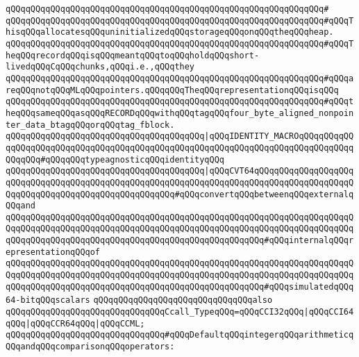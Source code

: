 \verb|qQQqqQQqqQQqqQQqqQQqqQQqqQQqqQQqqQQqqQQqqQQqqQQqqQQqqQQqqQQqqQQq#|\newline
\verb|qQQqqQQqqQQqqQQqqQQqqQQqqQQqqQQqqQQqqQQqqQQqqQQqqQQqqQQqqQQqqQQq#qQQqThisqQQqallocatesqQQquninitializedqQQqstorageqQQqonqQQqtheqQQqheap.|\newline
\verb|qQQqqQQqqQQqqQQqqQQqqQQqqQQqqQQqqQQqqQQqqQQqqQQqqQQqqQQqqQQqqQQq#qQQqTheqQQqrecordqQQqisqQQqmeantqQQqtoqQQqholdqQQqshort-livedqQQqCqQQqchunks,qQQqi.e.,qQQqthey|\newline
\verb|qQQqqQQqqQQqqQQqqQQqqQQqqQQqqQQqqQQqqQQqqQQqqQQqqQQqqQQqqQQqqQQq#qQQqareqQQqnotqQQqMLqQQqpointers.qQQqqQQqTheqQQqrepresentationqQQqisqQQq|\newline
\verb|qQQqqQQqqQQqqQQqqQQqqQQqqQQqqQQqqQQqqQQqqQQqqQQqqQQqqQQqqQQqqQQq#qQQqtheqQQqsameqQQqasqQQqRECORDqQQqwithqQQqtagqQQqfour_byte_aligned_nonpointer_data_btagqQQqorqQQqtag_fblock.|\newline
\newline
\verb|qQQqqQQqqQQqqQQqqQQqqQQqqQQqqQQqqQQqqQQq|\verb#|qQQqIDENTITY_MACROqQQqqQQqqQQqqQQqqQQqqQQqqQQqqQQqqQQqqQQqqQQqqQQqqQQqqQQqqQQqqQQqqQQqqQQqqQQqqQQqqQQqqQQq#\verb|#qQQqqQQqtypeagnosticqQQqidentityqQQq|\newline
\newline
\verb|qQQqqQQqqQQqqQQqqQQqqQQqqQQqqQQqqQQqqQQq|\verb#|qQQqCVT64qQQqqQQqqQQqqQQqqQQqqQQqqQQqqQQqqQQqqQQqqQQqqQQqqQQqqQQqqQQqqQQqqQQqqQQqqQQqqQQqqQQqqQQqqQQqqQQqqQQqqQQqqQQqqQQqqQQqqQQqqQQq#\verb|#qQQqconvertqQQqbetweenqQQqexternalqQQqand|\newline
\verb|qQQqqQQqqQQqqQQqqQQqqQQqqQQqqQQqqQQqqQQqqQQqqQQqqQQqqQQqqQQqqQQqqQQqqQQqqQQqqQQqqQQqqQQqqQQqqQQqqQQqqQQqqQQqqQQqqQQqqQQqqQQqqQQqqQQqqQQqqQQqqQQqqQQqqQQqqQQqqQQqqQQqqQQqqQQqqQQqqQQqqQQqqQQqqQQq#qQQqinternalqQQqrepresentationqQQqof|\newline
\verb|qQQqqQQqqQQqqQQqqQQqqQQqqQQqqQQqqQQqqQQqqQQqqQQqqQQqqQQqqQQqqQQqqQQqqQQqqQQqqQQqqQQqqQQqqQQqqQQqqQQqqQQqqQQqqQQqqQQqqQQqqQQqqQQqqQQqqQQqqQQqqQQqqQQqqQQqqQQqqQQqqQQqqQQqqQQqqQQqqQQqqQQqqQQqqQQq#qQQqsimulatedqQQq64-bitqQQqscalars|\newline
\newline
\verb|qQQqqQQqqQQqqQQqqQQqqQQqqQQqqQQqalso|\newline
\verb|qQQqqQQqqQQqqQQqqQQqqQQqqQQqqQQqCcall_TypeqQQq=qQQqCCI32qQQq|\verb#|qQQqCCI64qQQq|qQQqCCR64qQQq|qQQqCCML;#\newline
\newline
\verb|qQQqqQQqqQQqqQQqqQQqqQQqqQQqqQQq#qQQqDefaultqQQqintegerqQQqarithmeticqQQqandqQQqcomparisonqQQqoperators:|\newline
